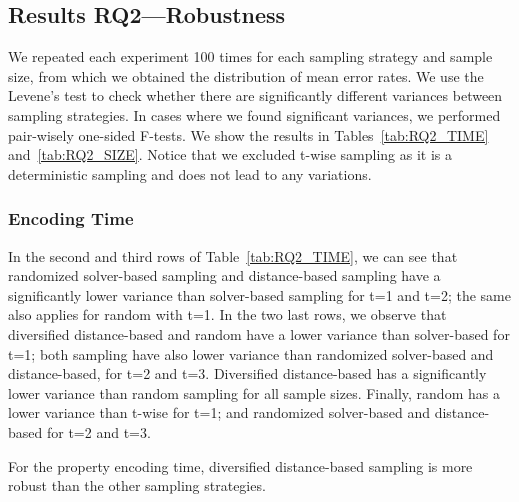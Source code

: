 

\subsection{Results RQ2—Robustness} \label{RQ2}

We repeated each experiment 100 times for each sampling strategy and sample size, from which we obtained the distribution of mean error rates. %
We use the Levene’s test to check whether there are significantly different variances between sampling strategies. In cases where we found significant variances, we performed pair-wisely one-sided F-tests. We show the results in Tables~\ref{tab:RQ2_TIME} and~\ref{tab:RQ2_SIZE}.
Notice that we excluded t-wise sampling as it is a deterministic sampling and does not lead to any variations.


\subsubsection{Encoding Time}

In the second and third rows of Table~\ref{tab:RQ2_TIME}, we can see that randomized solver-based sampling and distance-based sampling have a significantly lower variance than solver-based sampling for t=1 and t=2; the same also applies for random with t=1.
In the two last rows, we observe that diversified distance-based and random have a lower variance than solver-based for t=1; both sampling have also lower variance than randomized solver-based and distance-based, for t=2 and t=3.
Diversified distance-based has a significantly lower variance than random sampling for all sample sizes.
Finally, random has a lower variance than t-wise for t=1; and randomized solver-based and distance-based for t=2 and t=3.

\begin{tcolorbox}
For the property encoding time, diversified distance-based sampling is more robust than the other sampling strategies.
\end{tcolorbox}



